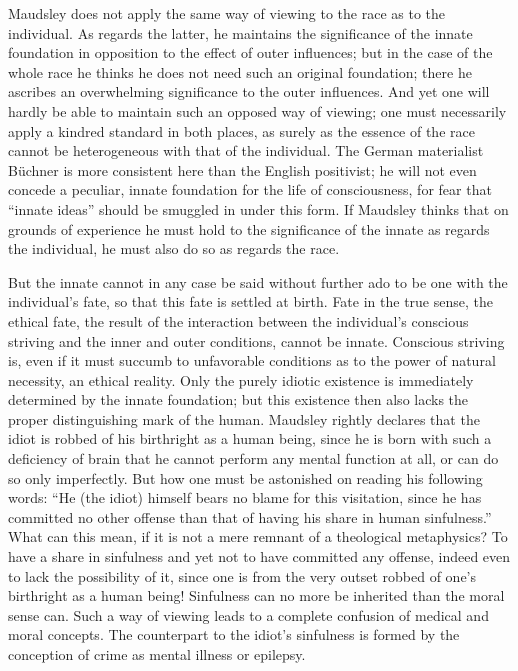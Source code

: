 \documentclass[12pt,a4paper,openany]{book}
\newcommand{\opage}[1]{\marginnote{\footnotesize\textit{[#1]}}}
\begin{document}
Maudsley does not apply the same way of viewing
to the race as to the individual. As regards the latter, he maintains
the significance of the innate foundation in opposition to the
effect of outer influences; but in the case of the whole race he thinks
he does not need such an original foundation; there he ascribes
an overwhelming significance to the outer influences.
And yet one will hardly be able to maintain such an opposed
way of viewing; one must necessarily apply a
kindred standard in both places, as surely as the essence of the race
cannot be heterogeneous with that of the individual. The German
materialist Büchner is more consistent here than the English
positivist; he will not even concede a peculiar, innate
foundation for the life of consciousness, for fear that
``innate ideas'' should be smuggled in under this form. If
Maudsley thinks that on grounds of experience he must hold to the significance
of the innate as regards the individual, he must
also do so as regards the race.

But the innate cannot in any case be said without
further ado to be one with the individual's fate, so that
this fate is settled at birth. Fate in the true sense,
the ethical fate, the result of the interaction between
the individual's conscious striving and the inner and outer conditions,
cannot be innate. Conscious striving is, even if
\opage{331}it must succumb to unfavorable conditions as to
the power of natural necessity, an ethical reality. Only the purely
idiotic existence is immediately determined by the innate
foundation; but this existence then also lacks the proper
distinguishing mark of the human. Maudsley rightly declares
that the idiot is robbed of his birthright as a human being,
since he is born with such a deficiency of brain that he cannot
perform any mental function at all, or can do so only
imperfectly. But how one must be astonished on reading his
following words: ``He (the idiot) himself bears no blame for
this visitation, since he has committed no other
offense than that of having his share in human
sinfulness.'' What can this mean, if it is not
a mere remnant of a theological metaphysics? To have a share
in sinfulness and yet not to have committed any offense,
indeed even to lack the possibility of it, since one is from the very outset
robbed of one's birthright as a human being! Sinfulness can
no more be inherited than the moral sense can. Such
a way of viewing leads to a complete confusion
of medical and moral concepts. The counterpart
to the idiot's sinfulness is formed by the conception of crime
as mental illness or epilepsy.
\end{document}
